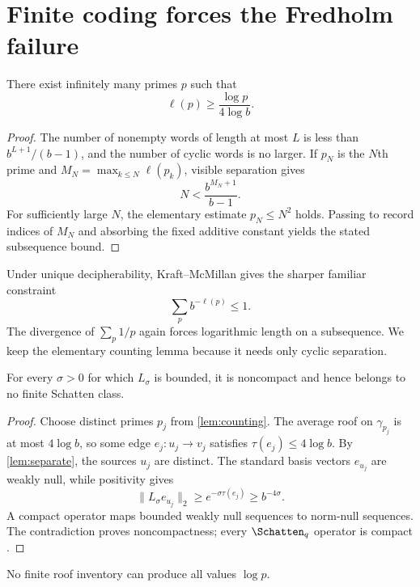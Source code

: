 \section{Finite coding forces the Fredholm failure}

\begin{lemma}\label{lem:counting}
There exist infinitely many primes $p$ such that
\[
  \ell(p)\ge \frac{\log p}{4\log b}.
\]
\end{lemma}

\begin{proof}
The number of nonempty words of length at most $L$ is less than
$b^{L+1}/(b-1)$, and the number of cyclic words is no larger.  If $p_N$ is
the $N$th prime and $M_N=\max_{k\le N}\ell(p_k)$, visible separation gives
\[
  N<\frac{b^{M_N+1}}{b-1}.
\]
For sufficiently large $N$, the elementary estimate $p_N\le N^2$ holds.
Passing to record indices of $M_N$ and absorbing the fixed additive
constant yields the stated subsequence bound.
\end{proof}

Under unique decipherability, Kraft--McMillan gives the sharper familiar
constraint
\[
  \sum_p b^{-\ell(p)}\le1.
\]
The divergence of $\sum_p1/p$ again forces logarithmic length on a
subsequence.  We keep the elementary counting lemma because it needs only
cyclic separation.

\begin{theorem}\label{thm:noncompact}
For every $\sigma>0$ for which $L_\sigma$ is bounded, it is noncompact and
hence belongs to no finite Schatten class.
\end{theorem}

\begin{proof}
Choose distinct primes $p_j$ from \cref{lem:counting}.  The average roof on
$\gamma_{p_j}$ is at most $4\log b$, so some edge
$e_j:u_j\to v_j$ satisfies $\tau(e_j)\le4\log b$.  By
\cref{lem:separate}, the sources $u_j$ are distinct.  The standard basis
vectors $e_{u_j}$ are weakly null, while positivity gives
\[
  \|L_\sigma e_{u_j}\|_2
    \ge e^{-\sigma\tau(e_j)}
    \ge b^{-4\sigma}.
\]
A compact operator maps bounded weakly null sequences to norm-null
sequences.  The contradiction proves noncompactness; every
$\Schatten_q$ operator is compact \citep{simon2005}.
\end{proof}

\begin{corollary}\label{cor:roofrank}
No finite roof inventory can produce all values $\log p$.
\end{corollary}

